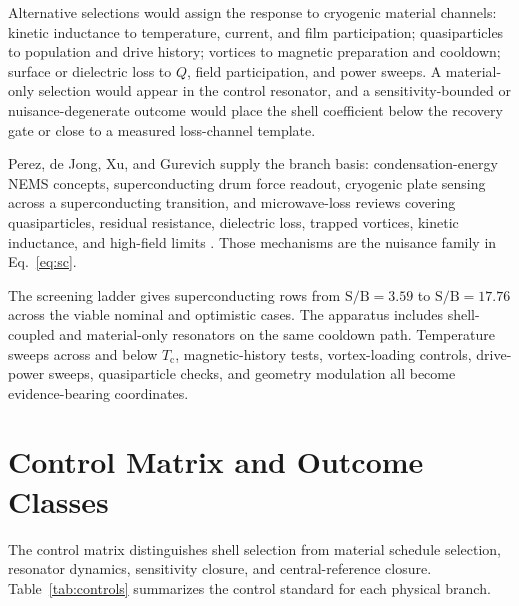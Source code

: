 \documentclass[11pt]{article}
\newcommand{\sbr}{\mathrm{S/B}}
\newcommand{\Tc}{T_{\mathrm{c}}}
\begin{document}
Alternative selections would assign the response to cryogenic material
channels: kinetic inductance to temperature, current, and film participation;
quasiparticles to population and drive history; vortices to magnetic
preparation and cooldown; surface or dielectric loss to \(Q\), field
participation, and power sweeps. A material-only selection would appear in the
control resonator, and a sensitivity-bounded or nuisance-degenerate outcome
would place the shell coefficient below the recovery gate or close to a
measured loss-channel template.

Perez, de Jong, Xu, and Gurevich supply the branch basis:
condensation-energy NEMS concepts, superconducting drum force readout,
cryogenic plate sensing across a superconducting transition, and microwave-loss
reviews covering quasiparticles, residual resistance, dielectric loss, trapped
vortices, kinetic inductance, and high-field limits
\cite{Perez2020,DeJong2025,Xu2026,Gurevich2023}. Those mechanisms are the
nuisance family in Eq.~\ref{eq:sc}.

The screening ladder gives superconducting rows from \(\sbr=3.59\) to
\(\sbr=17.76\) across the viable nominal and optimistic cases. The apparatus
includes shell-coupled and material-only resonators on the same cooldown path.
Temperature sweeps across and below \(\Tc\), magnetic-history
tests, vortex-loading controls, drive-power sweeps, quasiparticle checks, and
geometry modulation all become evidence-bearing coordinates.

\section{Control Matrix and Outcome Classes}

The control matrix distinguishes shell selection from material schedule
selection, resonator dynamics, sensitivity closure, and central-reference
closure. Table~\ref{tab:controls} summarizes the control standard for each
physical branch.
\end{document}
